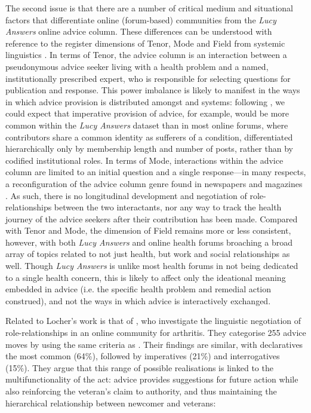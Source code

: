 The second issue is that there are a number of critical medium and situational factors that differentiate online (forum\hyp{}based) communities from the \emph{Lucy Answers} online advice column. These differences can be understood with reference to the register dimensions of Tenor, Mode and Field from systemic linguistics \cite{halliday_language_1989}. In terms of Tenor, the advice column is an interaction between a pseudonymous advice seeker living with a health problem and a named, institutionally prescribed expert, who is responsible for selecting questions for publication and response. This power imbalance is likely to manifest in the ways in which advice provision is distributed amongst  and  systems: following \textcite{decapua_`if_1995}, we could expect that imperative provision of advice, for example, would be more common within the \emph{Lucy Answers} dataset than in most online \glspl{forum}, where contributors share a common identity as sufferers of a condition, differentiated hierarchically only by membership length and number of \glspl{post}, rather than by codified institutional roles. In terms of Mode, interactions within the advice column are limited to an initial question and a single response---in many respects, a reconfiguration of the advice column genre found in newspapers and magazines \cite[see][]{herring_discourse_2011}. As such, there is no longitudinal development and negotiation of role\hyp{}relationships between the two interactants, nor any way to track the health journey of the advice seekers after their contribution has been made. Compared with Tenor and Mode, the dimension of Field remains more or less consistent, however, with both \emph{Lucy Answers} and online health \glspl{forum} broaching a broad array of topics related to not just health, but work and social relationships as well. Though \emph{Lucy Answers} is unlike most health \glspl{forum} in not being dedicated to a single health concern, this is likely to affect only the ideational meaning embedded in advice (i.e. the specific health problem and remedial action construed), and not the ways in which advice is interactively exchanged.

Related to Locher's work is that of \textcite{harrison2009politeness}, who investigate the linguistic negotiation of role\hyp{}relationships in an online community for arthritis. They categorise 255 advice moves by  using the same criteria as \textcite{locher2006advice}. Their findings are similar, with declaratives the most common (64\%), followed by imperatives (21\%) and interrogatives (15\%). They argue that this range of possible realisations is linked to the multifunctionality of the act: advice provides suggestions for future action while also reinforcing the veteran's claim to authority, and thus maintaining the hierarchical relationship between newcomer and veterans:

